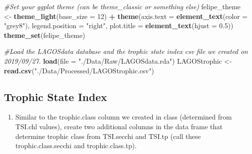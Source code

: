 \documentclass[]{article}
\newenvironment{Shaded}{\begin{snugshade}}{\end{snugshade}}
\newcommand{\CommentTok}[1]{\textcolor[rgb]{0.56,0.35,0.01}{\textit{#1}}}
\newcommand{\DataTypeTok}[1]{\textcolor[rgb]{0.13,0.29,0.53}{#1}}
\newcommand{\DecValTok}[1]{\textcolor[rgb]{0.00,0.00,0.81}{#1}}
\newcommand{\FloatTok}[1]{\textcolor[rgb]{0.00,0.00,0.81}{#1}}
\newcommand{\KeywordTok}[1]{\textcolor[rgb]{0.13,0.29,0.53}{\textbf{#1}}}
\newcommand{\NormalTok}[1]{#1}
\newcommand{\OperatorTok}[1]{\textcolor[rgb]{0.81,0.36,0.00}{\textbf{#1}}}
\newcommand{\StringTok}[1]{\textcolor[rgb]{0.31,0.60,0.02}{#1}}
\providecommand{\tightlist}{%
  \setlength{\itemsep}{0pt}\setlength{\parskip}{0pt}}
\begin{document}
\begin{Shaded}
\begin{Highlighting}[]
\CommentTok{#Set your ggplot theme (can be theme_classic or something else)}
\NormalTok{felipe_theme <-}\StringTok{ }\KeywordTok{theme_light}\NormalTok{(}\DataTypeTok{base_size =} \DecValTok{12}\NormalTok{) }\OperatorTok{+}
\StringTok{  }\KeywordTok{theme}\NormalTok{(}\DataTypeTok{axis.text =} \KeywordTok{element_text}\NormalTok{(}\DataTypeTok{color =} \StringTok{"grey8"}\NormalTok{), }
        \DataTypeTok{legend.position =} \StringTok{"right"}\NormalTok{, }\DataTypeTok{plot.title =} \KeywordTok{element_text}\NormalTok{(}\DataTypeTok{hjust =} \FloatTok{0.5}\NormalTok{)) }
\KeywordTok{theme_set}\NormalTok{(felipe_theme)}


\CommentTok{#Load the LAGOSdata database and the trophic state index csv file we created on 2019/09/27.}
\KeywordTok{load}\NormalTok{(}\DataTypeTok{file =} \StringTok{"./Data/Raw/LAGOSdata.rda"}\NormalTok{)}
\NormalTok{LAGOStrophic <-}\StringTok{ }\KeywordTok{read.csv}\NormalTok{(}\StringTok{"./Data/Processed/LAGOStrophic.csv"}\NormalTok{)}
\end{Highlighting}
\end{Shaded}

\hypertarget{trophic-state-index}{%
\subsection{Trophic State Index}\label{trophic-state-index}}

\begin{enumerate}
\def\labelenumi{\arabic{enumi}.}
\setcounter{enumi}{4}
\tightlist
\item
  Similar to the trophic.class column we created in class (determined
  from TSI.chl values), create two additional columns in the data frame
  that determine trophic class from TSI.secchi and TSI.tp (call these
  trophic.class.secchi and trophic.class.tp).
\end{enumerate}
\end{document}
